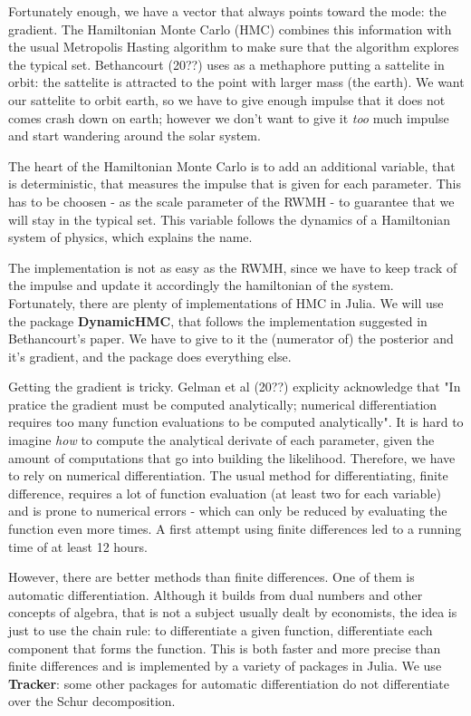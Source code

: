 \documentclass[12pt,a4paper]{article}
\begin{document}
Fortunately enough, we have a vector that always points toward the mode: the gradient. The Hamiltonian Monte Carlo (HMC) combines this information with the usual Metropolis Hasting algorithm to make sure that the algorithm explores the typical set. Bethancourt (20??) uses as a methaphore putting a sattelite in orbit: the sattelite is attracted to the point with larger mass (the earth). We want our sattelite to orbit earth, so we have to give enough impulse that it does not comes crash down on earth; however we don't want to give it \emph{too} much impulse and start wandering around the solar system.

The heart of the Hamiltonian Monte Carlo is to add an additional variable, that is deterministic, that measures the impulse that is given for each parameter. This has to be choosen - as the scale parameter of the RWMH - to guarantee that we will stay in the typical set. This variable follows the dynamics of a Hamiltonian system of physics, which explains the name.

The implementation is not as easy as the RWMH, since we have to keep track of the impulse and update it accordingly the hamiltonian of the system. Fortunately, there are plenty of implementations of HMC in Julia. We will use the package \textbf{DynamicHMC}, that follows the implementation suggested in Bethancourt's paper. We have to give to it the (numerator of) the posterior and it's gradient, and the package does everything else.

Getting the gradient is tricky. Gelman et al (20??) explicity acknowledge that "In pratice the gradient must be computed analytically; numerical differentiation requires too many function evaluations to be computed analytically". It is hard to imagine \emph{how} to compute the analytical derivate of each parameter, given the amount of computations that go into building the likelihood. Therefore, we have to rely on numerical differentiation. The usual method for differentiating, finite difference, requires a lot of function evaluation (at least two for each variable) and is prone to numerical errors - which can only be reduced by evaluating the function even more times. A first attempt using finite differences led to a running time of at least 12 hours.

However, there are better methods than finite differences. One of them is automatic differentiation. Although it builds from dual numbers and other concepts of algebra, that is not a subject usually dealt by economists, the idea is just to use the chain rule: to differentiate a given function, differentiate each component that forms the function. This is both faster and more precise than finite differences and is implemented by a variety of packages in Julia. We use \textbf{Tracker}: some other packages for automatic differentiation do not differentiate over the Schur decomposition.
\end{document}

